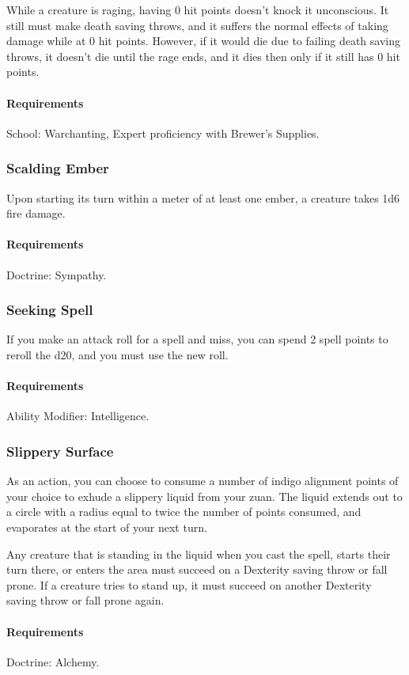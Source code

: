     While a creature is raging, having 0 hit points doesn't knock it unconscious.
    It still must make death saving throws, and it suffers the normal effects of taking damage while at 0 hit points.
    However, if it would die due to failing death saving throws, it doesn't die until the rage ends, and it dies then only if it still has 0 hit points.
    \paragraph{Requirements} School: Warchanting, Expert proficiency with Brewer's Supplies.
\subsubsection{Scalding Ember} \label{feat::scaldingember}
    Upon starting its turn within a meter of at least one ember, a creature takes 1d6 fire damage.
    \paragraph{Requirements} Doctrine: Sympathy.
\subsubsection{Seeking Spell} \label{feat::seekingspell}
    If you make an attack roll for a spell and miss, you can spend 2 spell points to reroll the d20, and you must use the new roll.
    \paragraph{Requirements} Ability Modifier: Intelligence.
\subsubsection{Slippery Surface} \label{feat::slipperysurface}
    As an action, you can choose to consume a number of indigo alignment points of your choice to exhude a slippery liquid from your zuan.
    The liquid extends out to a circle with a radius equal to twice the number of points consumed, and evaporates at the start of your next turn.

    Any creature that is standing in the liquid when you cast the spell, starts their turn there, or enters the area must succeed on a Dexterity saving throw or fall prone.
    If a creature tries to stand up, it must succeed on another Dexterity saving throw or fall prone again.
    \paragraph{Requirements} Doctrine: Alchemy.
